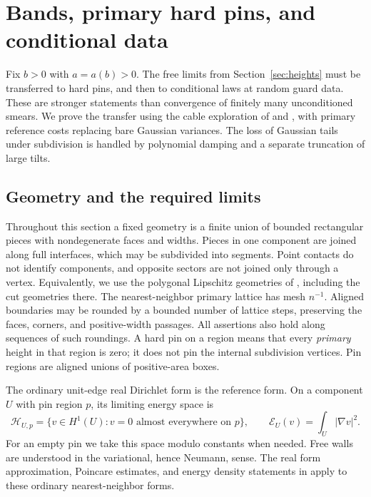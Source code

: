 \section{Bands, primary hard pins, and conditional data}\label{sec:pins}

Fix \(b>0\) with \(a=a(b)>0\).
The free limits from Section~\ref{sec:heights} must be transferred
to hard pins, and then to conditional laws at random guard data.
These are stronger statements than convergence of finitely many
unconditioned smears. We prove the transfer using the cable
exploration of  and , with
primary reference costs replacing bare Gaussian variances.
The loss of Gaussian tails under subdivision is handled by
polynomial damping and a separate truncation of large tilts.

\subsection{Geometry and the required limits}

Throughout this section a fixed geometry is a finite union of
bounded rectangular pieces with nondegenerate faces and widths.
Pieces in one component are joined along full interfaces, which
may be subdivided into segments. Point contacts do not identify
components, and opposite sectors are not joined only through a
vertex. Equivalently, we use the polygonal Lipschitz geometries
of , including the cut geometries there.
The nearest-neighbor primary lattice has mesh \(n^{-1}\).
Aligned boundaries may be rounded by a bounded number of lattice
steps, preserving the faces, corners, and positive-width passages.
All assertions also hold along sequences of such roundings.
A hard pin on a region means that every \emph{primary} height in
that region is zero; it does not pin the internal subdivision
vertices. Pin regions are aligned unions of positive-area boxes.

The ordinary unit-edge real Dirichlet form is the reference form.
On a component \(U\) with pin region \(p\), its limiting energy
space is
\[
 \mathcal H_{U,p}=\{v\in H^1(U):v=0\text{ almost everywhere on }p\},
 \qquad \mathcal E_U(v)=\int_U|\nabla v|^2.
\]
For an empty pin we take this space modulo constants when needed.
Free walls are understood in the variational, hence Neumann, sense.
The real form approximation, Poincare estimates, and energy
density statements in  apply to these ordinary
nearest-neighbor forms.

